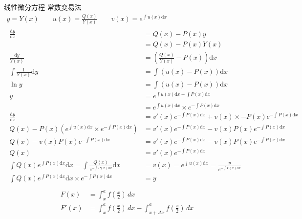 \documentclass{article}
\newcommand\di[1]{\text{d}#1}
\begin{document}
  线性微分方程 常数变易法
  \begin{gather*}
    y = Y(x) \qquad u(x) = \frac{Q(x)}{Y(x)} \qquad v(x) = e^{\int u(x)\di{x}}\\
    \begin{aligned}
      \frac{\di{y}}{\di{x}} &= Q(x) - P(x)y \\
      &= Q(x) - P(x)Y(x) \\
      \frac{\di{y}}{Y(x)} &=  \left( \frac{Q(x)}{Y(x)} - P(x) \right)\di{x} \\
      \int\frac{1}{Y(x)}\di{y} &= \int\left(u(x) - P(x)\right)\di{x} \\
      \ln{y} &= \int\left(u(x) - P(x)\right)\di{x}\\
      y &= e^{\int u(x)\di{x} -\int P(x)\di{x}} \\
      &= e^{\int u(x)\di{x}} \times e^{-\int P(x)\di{x}} \\
      \frac{\di{y}}{\di{x}} &= v'(x)e^{-\int P(x)\di{x}} + v(x) \times -P(x)e^{-\int P(x)\di{x}} \\
      Q(x) - P(x)\left( e^{\int u(x)\di{x}} \times e^{-\int P(x)\di{x}} \right) &= v'(x)e^{-\int P(x)\di{x}} - v(x)P(x)e^{-\int P(x)\di{x}} \\
      Q(x) - v(x)P(x)e^{-\int P(x)\di{x}} &= v'(x)e^{-\int P(x)\di{x}} - v(x)P(x)e^{-\int P(x)\di{x}} \\
      Q(x) &= v'(x)e^{-\int P(x)\di{x}} \\
      \int Q(x)e^{\int P(x)\di{x}}\di{x} = \int \frac{Q(x)}{e^{-\int P(x)\di{x}}}\di{x} &= v(x) = e^{\int u(x)\di{x}} = \frac{y}{e^{-\int P(x)\di{x}}}  \\
      \int Q(x)e^{\int P(x)\di{x}}\di{x} \times e^{-\int P(x)\di{x}} &= y 
    \end{aligned} \\
  \end{gather*}
  \begin{align*}
    F\left(x\right) &= \int_{x}^{a} f\left(\frac{x}{2}\right) \,dx \\
    F'\left(x\right) &= \int_{x}^{a} f\left(\frac{x}{2}\right) \,dx
                        -\int_{x + \Delta{x}}^{a} f\left(\frac{x}{2}\right) \,dx
  \end{align*}
\end{document}
